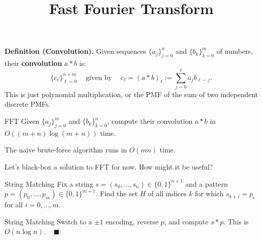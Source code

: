 \title{Fast Fourier Transform}



\textbf{Definition (Convolution).} Given sequences $\{a_j\}_{j = 0}^n$ and $\{b_k\}_{k = 0}^m$ of numbers, their \textbf{convolution} $a \ast b$ is:
\[ \{c_\ell\}_{\ell = 0}^{n + m} ~~~~ \text{ given by } ~~~~ c_{\ell} = (a \ast b)_{\ell} := \sum_{j = 0}^{\ell} a_j b_{\ell - j}.\]
This is just polynomial multiplication, or the PMF of the sum of two independent discrete PMFs.

\begin{problem}{FFT}
    Given $\{a_j\}_{j = 0}^m$ and $\{b_k\}_{k = 0}^n$, compute their convolution $a \ast b$ in $O((m + n) \log (m + n))$ time.
\end{problem}

\begin{remark}
    The naive brute-force algorithm runs in $O(mn)$ time.
\end{remark}

Let's black-box a solution to FFT for now.  How might it be useful?

\begin{problem}{String Matching}
    Fix a string $s = (s_0, \dots, s_n) \in \{0, 1\}^{n + 1}$ and a pattern $p = (p_0, \dots, p_m) \in \{0, 1\}^{m + 1}$.  Find the set $H$ of all indices $k$ for which $s_{k + i} = p_i$ for all $i = 0, \dots, m$.
\end{problem}

\begin{solution}{String Matching}
    Switch to a $\pm 1$ encoding, reverse $p$, and compute $s \ast p$.  This is $O(n \log n)$. ~ $\blacksquare$
\end{solution}

